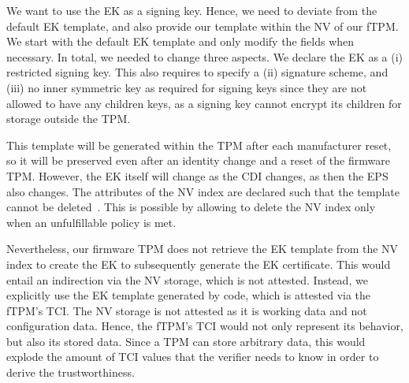 
We want to use the EK as a signing key.
Hence, we need to deviate from the default EK template, and also provide our template within the NV of our fTPM\@.
We start with the default EK template and only modify the fields when necessary.
In total, we needed to change three aspects.
We declare the EK as a (i) restricted signing key.
This also requires to specify a (ii) signature scheme, and (iii) no inner symmetric key as required for signing keys since they are not allowed to have any children keys, as a signing key cannot encrypt its children for storage outside the TPM\@.

This template will be generated within the TPM after each manufacturer reset, so it will be preserved even after an identity change and a reset of the firmware TPM\@.
However, the EK itself will change as the CDI changes, as then the EPS also changes.
The attributes of the NV index are declared such that the template cannot be deleted~\cite{tcgPcClient}.
This is possible by allowing to delete the NV index only when an unfulfillable policy is met.

Nevertheless, our firmware TPM does not retrieve the EK template from the NV index to create the EK to subsequently generate the EK certificate.
This would entail an indirection via the NV storage, which is not attested.
Instead, we explicitly use the EK template generated by code, which is attested via the fTPM's TCI\@.
The NV storage is not attested as it is working data and not configuration data.
Hence, the fTPM's TCI would not only represent its behavior, but also its stored data.
Since a TPM can store arbitrary data, this would explode the amount of TCI values that the verifier needs to know in order to derive the trustworthiness.


